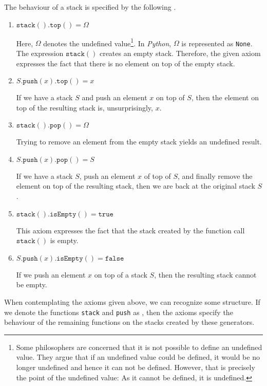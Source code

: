 The behaviour of a stack is specified by the following .
\begin{enumerate}
\item $\texttt{stack}().\texttt{top}() = \Omega$

      Here, $\Omega$ \index{$\Omega$} denotes the undefined value\footnote{
       Some philosophers are concerned that it is not possible to define an undefined value.
       They argue that if an undefined value could be defined, it would be no longer undefined
       and hence it can not be defined.  However, that is precisely the point of the undefined 
       value: As it cannot be defined, it is undefined. \raisebox{-0.1cm}{$\Large\smiley$}}.
      In \textsl{Python}, $\Omega$ is represented as \texttt{None}. The expression $\texttt{stack}()$
      creates an empty stack.  Therefore, the given axiom expresses the fact that there is no
      element on top of the empty stack.
\item $S.\texttt{push}(x).\texttt{top}() = x$

      If we have a stack $S$ and push an element $x$ on top of $S$, then the element on top
      of the resulting stack is, unsurprisingly, $x$.
\item $\texttt{stack}().\texttt{pop}() = \Omega$

      Trying to remove an element from the empty stack yields an undefined result.
\item $S.\texttt{push}(x).\texttt{pop}() = S$

      If we have a stack $S$, push an element $x$ of top of $S$, and finally remove the element
      on top of the resulting stack, then we are back at the original stack $S$.
    
\item $\texttt{stack}().\texttt{isEmpty}() = \texttt{true}$

      This axiom expresses the fact that the stack created by the function call $\texttt{stack}()$
      is empty.
\item $S.\texttt{push}(x).\texttt{isEmpty}() = \texttt{false}$

      If we push an element $x$ on top of a stack $S$, then the resulting stack cannot be empty.
\end{enumerate}
When contemplating the axioms given above, we can recognize some structure.  If we denote the
functions \texttt{stack} and \texttt{push} as ,  then the axioms specify the
behaviour of the remaining functions on the stacks created by these generators.


